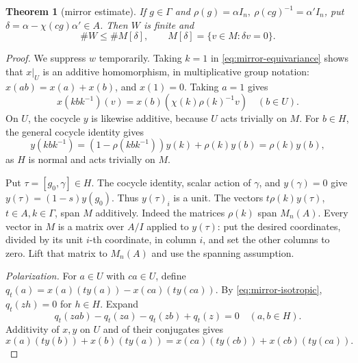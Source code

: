 \documentclass[11pt,a4paper]{article}
\newtheorem{theorem}{Theorem}[section]
\theoremstyle{definition}
\begin{document}
\begin{theorem}[mirror estimate]\label{thm:mirror}
If \(g\in\Gamma\) and
\(\rho(g)=\alpha I_n,\ \rho(cg)^{-1}=\alpha'I_n\),
put \(\delta=\alpha-\chi(cg)\alpha'\in A\).
Then \(W\) is finite and
\[
 \#W\le\#M[\delta],\qquad
 M[\delta]=\{v\in M:\delta v=0\}.
\]
\end{theorem}
\begin{proof}
We suppress \(w\) temporarily.
Taking \(k=1\) in \eqref{eq:mirror-equivariance} shows that \(x|_U\)
is an additive homomorphism, in multiplicative group notation:
\(x(ab)=x(a)+x(b)\), and \(x(1)=0\).
Taking \(a=1\) gives
\[
 x(k b k^{-1})(v)=x(b)(\chi(k)\rho(k)^{-1}v)\quad(b\in U).
\]
On \(U\), the cocycle \(y\) is likewise additive, because \(U\) acts
trivially on \(M\).
For \(b\in H\), the general cocycle identity gives
\[
 y(k b k^{-1})=(1-\rho(k b k^{-1}))y(k)+\rho(k)y(b)
             =\rho(k)y(b),
\]
as \(H\) is normal and acts trivially on \(M\).

Put \(\tau=[g_0,\gamma]\in H\).
The cocycle identity, scalar action of \(\gamma\), and \(y(\gamma)=0\)
give \(y(\tau)=(1-s)y(g_0)\). Thus \(y(\tau)_i\) is a unit.
The vectors \(t\rho(k)y(\tau)\), \(t\in A,k\in\Gamma\), span \(M\)
additively. Indeed the matrices \(\rho(k)\) span \(M_n(A)\).
Every vector in \(M\) is a matrix over \(A/I\) applied to \(y(\tau)\):
put the desired coordinates, divided by its unit \(i\)-th coordinate,
in column \(i\), and set the other columns to zero.
Lift that matrix to \(M_n(A)\) and use the spanning assumption.

\emph{Polarization.}
For \(a\in U\) with \(ca\in U\), define
\(q_t(a)=x(a)(t y(a))-x(ca)(t y(ca))\).
By \eqref{eq:mirror-isotropic}, \(q_t(zh)=0\) for \(h\in H\).
Expand
\[
 q_t(zab)-q_t(za)-q_t(zb)+q_t(z)=0\quad(a,b\in H).
\]
Additivity of \(x,y\) on \(U\) and of their conjugates gives
\begin{equation}\label{eq:mirror-polar}
 x(a)(t y(b))+x(b)(t y(a))
  =x(ca)(t y(cb))+x(cb)(t y(ca)).
\end{equation}


\end{proof}
\end{document}
